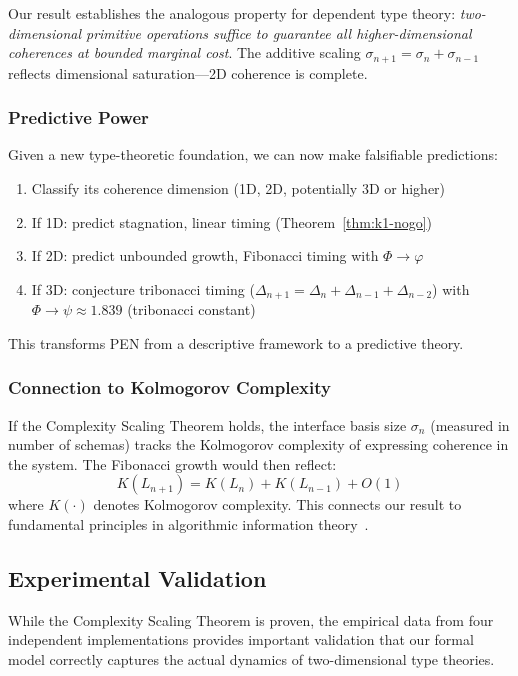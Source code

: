 \documentclass[11pt]{article}
\theoremstyle{definition}
\theoremstyle{remark}
\begin{document}
Our result establishes the analogous property for dependent type theory: \emph{two-dimensional primitive
operations suffice to guarantee all higher-dimensional coherences at bounded marginal cost}. The
additive scaling $\sigma_{n+1} = \sigma_n + \sigma_{n-1}$ reflects dimensional saturation---2D coherence is
complete.

\subsubsection{Predictive Power}

Given a new type-theoretic foundation, we can now make falsifiable predictions:
\begin{enumerate}
\item Classify its coherence dimension (1D, 2D, potentially 3D or higher)
\item If 1D: predict stagnation, linear timing (Theorem~\ref{thm:k1-nogo})
\item If 2D: predict unbounded growth, Fibonacci timing with $\Phi \to \varphi$
\item If 3D: conjecture tribonacci timing ($\Delta_{n+1} = \Delta_n + \Delta_{n-1} + \Delta_{n-2}$) with
$\Phi \to \psi \approx 1.839$ (tribonacci constant)
\end{enumerate}

This transforms PEN from a descriptive framework to a predictive theory.

\subsubsection{Connection to Kolmogorov Complexity}

If the Complexity Scaling Theorem holds, the interface basis size $\sigma_n$ (measured in number of
schemas) tracks the Kolmogorov complexity of expressing coherence in the system. The Fibonacci
growth would then reflect:
\[
K(L_{n+1}) = K(L_n) + K(L_{n-1}) + O(1)
\]
where $K(\cdot)$ denotes Kolmogorov complexity. This connects our result to fundamental principles
in algorithmic information theory~\cite{li2008kolmogorov}.

\subsection{Experimental Validation}

While the Complexity Scaling Theorem is proven, the empirical data from four independent
implementations provides important validation that our formal model correctly captures the actual
dynamics of two-dimensional type theories.
\end{document}
